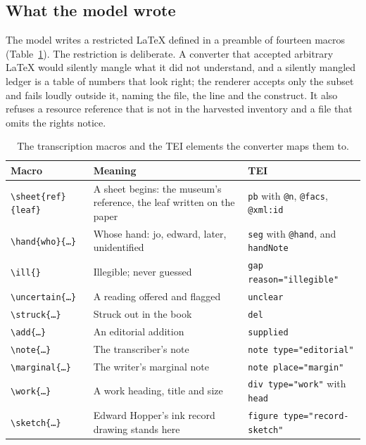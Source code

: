 \documentclass[11pt]{article}
\begin{document}
\subsection{What the model wrote}

The model writes a restricted LaTeX defined in a preamble of fourteen macros (Table~\ref{tab:macros}). The restriction is deliberate. A converter that accepted arbitrary LaTeX would silently mangle what it did not understand, and a silently mangled ledger is a table of numbers that look right; the renderer accepts only the subset and fails loudly outside it, naming the file, the line and the construct. It also refuses a resource reference that is not in the harvested inventory and a file that omits the rights notice.

\begin{table}[htbp]\centering\small
\caption{The transcription macros and the TEI elements the converter maps them to.}\label{tab:macros}
\begin{tabular}{lp{6.2cm}l}\toprule
Macro & Meaning & TEI\\\midrule
\texttt{\textbackslash sheet\{ref\}\{leaf\}} & A sheet begins: the museum's reference, the leaf written on the paper & \texttt{pb} with \texttt{@n}, \texttt{@facs}, \texttt{@xml:id}\\
\texttt{\textbackslash hand\{who\}\{…\}} & Whose hand: jo, edward, later, unidentified & \texttt{seg} with \texttt{@hand}, and \texttt{handNote}\\
\texttt{\textbackslash ill\{\}} & Illegible; never guessed & \texttt{gap reason="illegible"}\\
\texttt{\textbackslash uncertain\{…\}} & A reading offered and flagged & \texttt{unclear}\\
\texttt{\textbackslash struck\{…\}} & Struck out in the book & \texttt{del}\\
\texttt{\textbackslash add\{…\}} & An editorial addition & \texttt{supplied}\\
\texttt{\textbackslash note\{…\}} & The transcriber's note & \texttt{note type="editorial"}\\
\texttt{\textbackslash marginal\{…\}} & The writer's marginal note & \texttt{note place="margin"}\\
\texttt{\textbackslash work\{…\}} & A work heading, title and size & \texttt{div type="work"} with \texttt{head}\\
\texttt{\textbackslash sketch\{…\}} & Edward Hopper's ink record drawing stands here & \texttt{figure type="record-sketch"}\\

\end{tabular}
\end{table}
\end{document}
